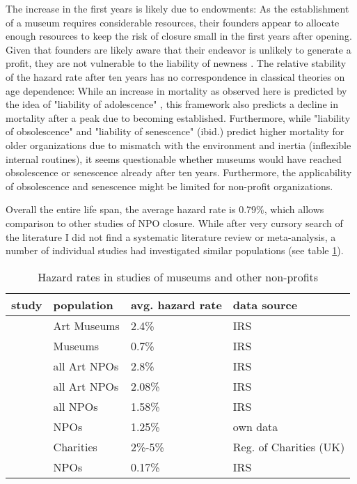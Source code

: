\documentclass[11pt]{article}
\begin{document}
The increase in the first years is likely due to endowments: As the establishment of a museum requires considerable resources, their founders appear to allocate enough resources to keep the risk of closure small in the first years after opening.
Given that founders are likely aware that their endeavor is unlikely to generate a profit, they are not vulnerable to the liability of newness \parencite{Stinchcombe_1965_structure}.
The relative stability of the hazard rate after ten years has no correspondence in classical theories on age dependence:
While an increase in mortality as observed here is predicted by the idea of "liability of adolescence" \parencite{Carroll_Khessina_2019_demography}, this framework also predicts a decline in mortality after a peak due to becoming established.
Furthermore, while "liability of obsolescence" and "liability of senescence" (ibid.) predict higher mortality for older organizations due to mismatch with the environment and inertia (inflexible internal routines), it seems questionable whether museums would have reached obsolescence or senescence already after ten years.
Furthermore, the applicability of obsolescence and senescence might be limited for non-profit organizations.


Overall the entire life span, the average hazard rate is 0.79\%, which allows comparison to other studies of NPO closure.
While after very cursory search of the literature I did not find a systematic literature review or meta-analysis, a number of individual studies had investigated similar populations (see table \ref{tbl:litreview}).

\begin{table}[htbp]
\caption{\label{tbl:litreview}Hazard rates in studies of museums and other non-profits}
\centering
\begin{tabular}{llll}
\hline
study & population & avg. hazard rate & data source\\
\hline
\cite{Hager_2001_vulnerability} & Art Museums & 2.4\% & IRS\\
\cite{Gordon_etal_2013_insolvency} & Museums & 0.7\% & IRS\\
\hline
\cite{Hager_2001_vulnerability} & all Art NPOs & 2.8\% & IRS\\
\cite{Gordon_etal_2013_insolvency} & all Art NPOs & 2.08\% & IRS\\
\cite{Gordon_etal_2013_insolvency} & all NPOs & 1.58\% & IRS\\
\cite{Hager_Galaskiewicz_Larson_2007_liability} & NPOs & 1.25\% & own data\\
\cite{Clifford_2018_reinforcing} & Charities & 2\%-5\% & Reg. of Charities (UK)\\
\cite{Mayer_2022_slimmer} & NPOs & 0.17\% & IRS\\
\hline
\end{tabular}
\end{table}
\end{document}
